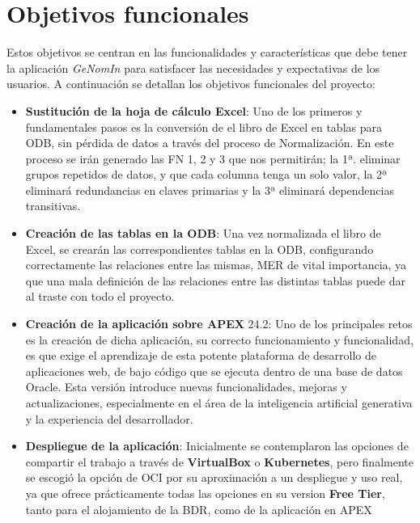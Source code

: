 \section{Objetivos funcionales}

Estos objetivos se centran en las funcionalidades y características que debe tener la aplicación \textit{GeNomIn} para satisfacer las necesidades y expectativas de los usuarios. A continuación se detallan los objetivos funcionales del proyecto:

\begin{itemize}
	\item \textbf{Sustitución de la hoja de cálculo Excel}: Uno de los primeros y fundamentales pasos es la conversión de el libro de Excel en tablas para \acrfull{ODB}, sin pérdida de datos a través del proceso de \gls{Normalización}.
	En este proceso se irán generado las \acrfull{FN} 1, 2 y 3 que nos permitirán; la 1ª. eliminar grupos repetidos de datos, y que cada columna tenga un solo valor, la 2ª eliminará redundancias en claves primarias y la 3ª eliminará dependencias transitivas.
	\item \textbf{Creación de las tablas en la \acrfull{ODB}}: Una vez normalizada el libro de Excel, se crearán las correspondientes tablas en la \acrshort{ODB}, configurando correctamente las relaciones entre las mismas, \gls{MER} de vital importancia, ya que una mala definición de las relaciones entre las distintas tablas puede dar al traste con todo el proyecto.
	\item \textbf{Creación de la aplicación sobre \acrfull{APEX}} 24.2: Uno de los principales retos es la creación de dicha aplicación, su correcto funcionamiento y  funcionalidad, es que exige el aprendizaje de esta potente  plataforma de desarrollo de aplicaciones web, de bajo código que se ejecuta dentro de una base de datos Oracle. Esta versión introduce nuevas funcionalidades, mejoras y actualizaciones, especialmente en el área de la inteligencia artificial generativa y la experiencia del desarrollador.
	\item \textbf{Despliegue de la aplicación}: Inicialmente se contemplaron las opciones de compartir el trabajo a través de \textbf{VirtualBox} o \textbf{Kubernetes}, pero finalmente se escogió la opción de \acrfull{OCI} por su aproximación a un despliegue y uso real, ya que ofrece prácticamente todas las opciones en su version \textbf{Free Tier}, tanto para el alojamiento de la \acrshort{BDR}, como de la aplicación en \acrfull{APEX}
		
\end{itemize}

